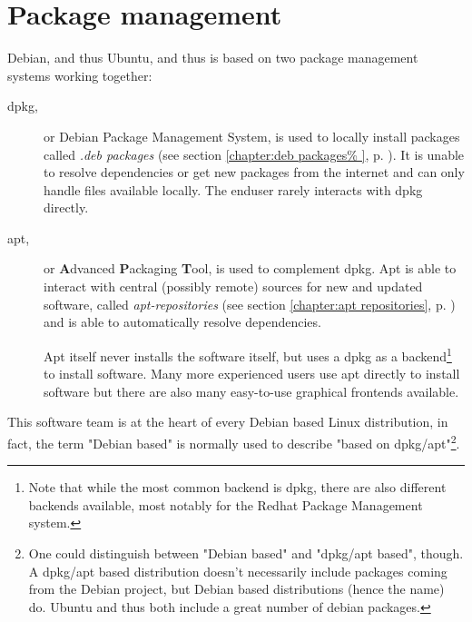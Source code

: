 
\chapter{Package management}
Debian, and thus Ubuntu, and thus \tunix is based on two package management
systems working together:
\begin{description}
  \item[dpkg,] or Debian Package Management System, is used to locally install
    packages called \emph{.deb packages} (see section \ref{chapter:deb packages%
    }, p. \pageref{chapter:deb packages}). It is unable to resolve dependencies
    or get new packages from the internet and can only handle files
    available locally. The enduser rarely interacts with dpkg directly.
  \item[apt,] or \textbf{A}dvanced \textbf{P}ackaging \textbf{T}ool, is used to
    complement dpkg. Apt is able to interact with central (possibly remote)
    sources for new and updated software, called \emph{apt-repositories} (see
    section \ref{chapter:apt repositories}, p. \pageref{chapter:apt %
    repositories}) and is able to automatically resolve dependencies.
    
    Apt itself never installs the software itself, but uses a
    dpkg as a backend\footnote{Note that while the most common backend is dpkg,
    there are also different backends available, most notably for the Redhat
    Package Management system.} to install software. Many more experienced
    users use apt directly to install software but there are also many
    easy-to-use graphical frontends available.
\end{description}
This software team is at the heart of every Debian based Linux distribution,
in fact, the term "Debian based" is normally used to describe "based on
dpkg/apt"\footnote{One could distinguish between "Debian based" and "dpkg/apt
based", though. A dpkg/apt based distribution doesn't necessarily include
packages coming from the Debian project, but Debian based distributions (hence
the name) do. Ubuntu and thus \tunix both include a great number of debian
packages.}.

